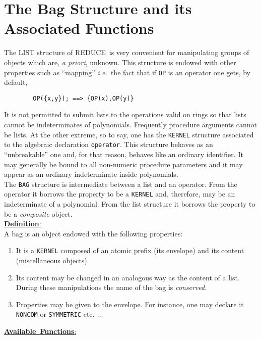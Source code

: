 \documentclass[11pt,letterpaper]{book}
\newcommand{\REDUCE}{REDUCE}
\begin{document}
\section{The Bag Structure and its Associated Functions}
The LIST structure of \REDUCE\ is very convenient for manipulating
groups of objects which are, {\em a priori}, unknown. This structure is
endowed with other properties such as ``mapping'' {\em i.e.\ }the fact
that if \verb+OP+ is an operator one gets, by default,
{\small\begin{verbatim}
        OP({x,y}); ==> {OP(x),OP(y)}
\end{verbatim}}
It is not permitted to submit lists to the operations valid on rings
so that lists cannot be indeterminates of polynomials.  Frequently
procedure arguments cannot be lists.
At the other extreme, so to say, one has the \verb+KERNEL+
structure associated
to the algebraic declaration \verb+operator+.  This structure behaves as
an ``unbreakable'' one and, for that reason, behaves
like an ordinary identifier.
It may generally be bound to all non-numeric procedure parameters
and it may appear
as an ordinary indeterminate inside polynomials. \\
The \verb+BAG+ structure is intermediate between a list and an operator.
From the operator it borrows the property to be a \verb+KERNEL+ and,
therefore, may be an indeterminate of a polynomial. From the list structure
it borrows the property to be a {\em composite} object.\\[5pt]
\mbox{\underline{{\bf Definition}:\hfill}}\\[4pt]
A bag is an object endowed with the following properties:
\begin{enumerate}
\item It is a \verb+KERNEL+ composed of an atomic prefix (its
envelope) and
its content (miscellaneous objects).
\item Its content may be changed in an analogous way as the content of a
list. During these manipulations the name of the bag is {\em conserved}.
\item Properties may be given to the envelope. For instance, one may
declare it \verb+NONCOM+ or \verb+SYMMETRIC+ etc.\ $\ldots$
\end{enumerate}
\vspace{5pt}
\mbox{\underline{{\bf Available Functions}:\hfill}}
\end{document}
